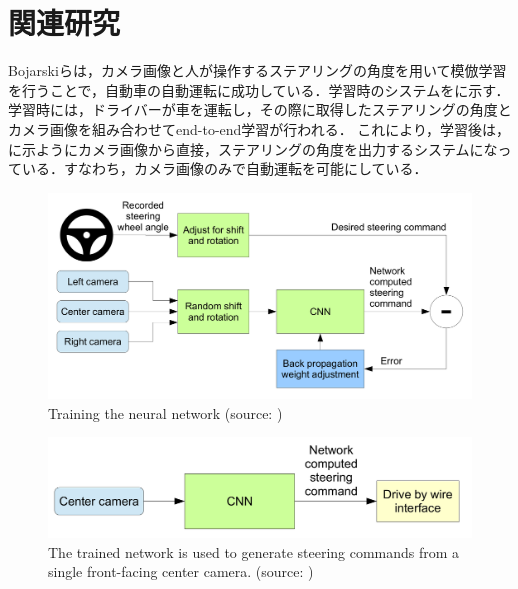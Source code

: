 
\section{関連研究}
     Bojarskiら\cite{bojarski}は，カメラ画像と人が操作するステアリングの角度を用いて模倣学習を行うことで，自動車の自動運転に成功している．学習時のシステムをに示す．学習時には，ドライバーが車を運転し，その際に取得したステアリングの角度とカメラ画像を組み合わせてend-to-end学習が行われる．
     これにより，学習後は，に示ようにカメラ画像から直接，ステアリングの角度を出力するシステムになっている．すなわち，カメラ画像のみで自動運転を可能にしている．
     
     \begin{figure}[h]
          \centering
          \includegraphics[keepaspectratio, scale=0.16] {images/bojarski_train.png}
          \caption[Training the neural network]{Training the neural network (source: \cite{bojarski})}
          \label{Fig:bojarski_train}
     \end{figure}



     \begin{figure}[h]
          \centering
          \includegraphics[keepaspectratio, scale=0.20] {images/bojarski_test.png}
          \captionsetup{justification=raggedright} %
          \caption[The trained network is used to generate steering commands from a single front-facing center camera.]{The trained network is used to generate steering commands from a single front-facing center camera. (source: \cite{bojarski})}
          \label{Fig:bojarski_test}
     \end{figure}

